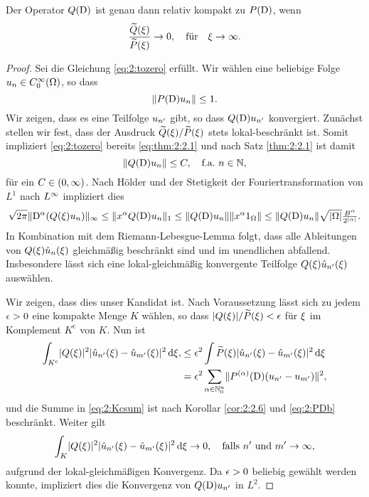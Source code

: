\begin{thm}
Der Operator $Q(\mathrm D)$ ist genau dann relativ kompakt zu $P(\mathrm D)$,
wenn
\begin{equation}\label{eq:2:tozero}
\frac{\widetilde{Q}(\xi)}{\widetilde{P}(\xi)}\to0,\quad\text{für}\quad\xi\to\infty.
\end{equation}
\end{thm}
\begin{proof}
Sei die Gleichung \eqref{eq:2:tozero} erfüllt.
Wir wählen eine beliebige Folge $u_n\in C^\infty_0(\Omega)$,
so dass 
\begin{equation}\label{eq:2:PDb}
\lVert P(\mathrm D)u_n\rVert\leq1.
\end{equation}
Wir zeigen, dass es eine Teilfolge $u_{n^\prime}$ gibt,
so dass $Q(\mathrm D)u_{n^\prime}$ konvergiert.
Zunächst stellen wir fest, dass der Ausdruck $\widetilde{Q}(\xi)/\widetilde{P}(\xi)$
stets lokal-beschränkt ist.
Somit impliziert \eqref{eq:2:tozero} bereits \eqref{eq:thm:2:2.1}
und nach Satz \ref{thm:2:2.1} ist damit
\begin{equation}
\lVert Q(\mathrm D)u_n\rVert\leq C,
\quad\text{f.a.}~n\in\mathbb N,
\end{equation}
für ein $C\in(0,\infty)$.
Nach Hölder und der Stetigkeit der Fouriertransformation
von $L^1$ nach $L^\infty$ impliziert dies
\begin{equation}
\sqrt{2\pi}\lVert\mathrm D^\alpha(Q(\xi)u_n)\rVert_\infty\leq\lVert x^\alpha Q(\mathrm D)u_n\rVert_1\leq\lVert Q(\mathrm D)u_n\rVert\lVert x^\alpha1_\Omega\rVert
\leq\lVert Q(\mathrm D)u_n\rVert\sqrt{\lvert\Omega\rvert}\tfrac{B^\alpha}{2^{\lvert\alpha\rvert}}.
\end{equation}
In Kombination mit dem Riemann-Lebesgue-Lemma folgt,
dass alle Ableitungen von $Q(\xi)\hat{u}_n(\xi)$
gleichmäßig beschränkt sind und im unendlichen abfallend.
Insbesondere lässt sich eine lokal-gleichmäßig konvergente Teilfolge $Q(\xi)\hat{u}_{n^\prime}(\xi)$ auswählen.

Wir zeigen, dass dies unser Kandidat ist.
Nach Voraussetzung lässt sich zu jedem $\epsilon>0$ eine kompakte Menge $K$ wählen,
so dass $\lvert Q(\xi)\rvert/\widetilde{P}(\xi)<\epsilon$ für $\xi$ im Komplement $K^{\mathrm c}$ von $K$.
Nun ist
\begin{align}
\int_{K^{\mathrm c}}\lvert Q(\xi)\rvert^2\lvert\hat{u}_{n^\prime}(\xi)-\hat{u}_{m^\prime}(\xi)\rvert^2\,\mathrm d \xi,
&\leq\epsilon^2\int\widetilde{P}(\xi)\lvert\hat{u}_{n^\prime}(\xi)-\hat{u}_{m^\prime}(\xi)\rvert^2\,\mathrm d \xi\\
&=\epsilon^2\sum_{\alpha\in\mathbb N^n_0}\lVert P^{(\alpha)}(\mathrm D)(u_{n^\prime}-u_{m^\prime})\rVert^2,\label{eq:2:Kcsum}
\end{align}
und die Summe in \eqref{eq:2:Kcsum} ist nach Korollar \ref{cor:2:2.6}
und \eqref{eq:2:PDb} beschränkt.
Weiter gilt
\begin{equation}
\int_K\lvert Q(\xi)\rvert^2\lvert\hat{u}_{n^\prime}(\xi)-\hat{u}_{m^\prime}(\xi)\rvert^2\,\mathrm d \xi\to0,
\quad\text{falls}~n^\prime~\text{und}~m^\prime\to\infty,
\end{equation}
aufgrund der lokal-gleichmäßigen Konvergenz.
Da $\epsilon>0$ beliebig gewählt werden konnte,
impliziert dies die Konvergenz von $Q(\mathrm D)u_{n^\prime}$ in $L^2$.


\end{proof}

